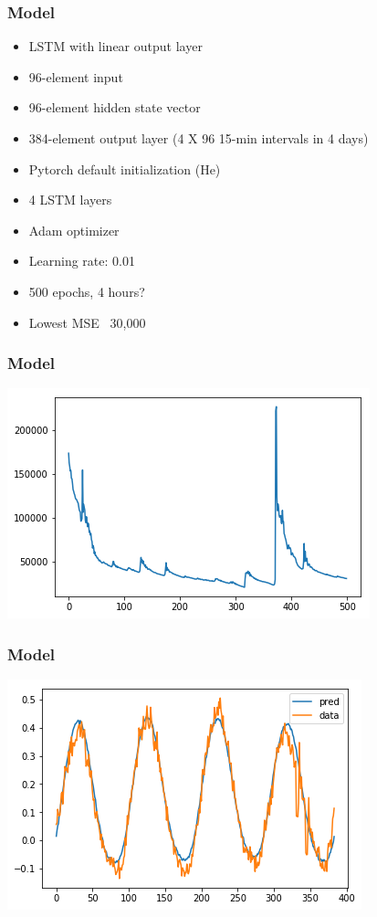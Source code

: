 \documentclass{beamer}
\begin{document}
\begin{frame}
  \frametitle{Model}
  \begin{itemize}
    \item LSTM with linear output layer
    \item 96-element input
    \item 96-element hidden state vector
    \item 384-element output layer (4 X 96 15-min intervals in 4 days)
    \item Pytorch default initialization (He)
    \item 4 LSTM layers
    \item Adam optimizer
    \item Learning rate: 0.01
    \item 500 epochs, 4 hours?
    \item Lowest MSE ~30,000
  \end{itemize}
\end{frame}

\begin{frame}
  \frametitle{Model}
  \includegraphics[width=\textwidth]{MSE.png}
\end{frame}

\begin{frame}
  \frametitle{Model}
  \includegraphics[width=\textwidth]{goodfit.png}
\end{frame}
\end{document}
